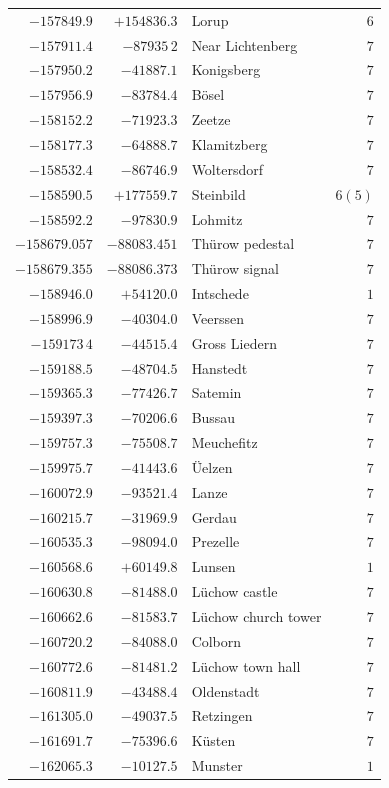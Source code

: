 \begin{center}
\begin{tabular}{r|r|p{170pt}|r}
\(-157849.9\)&\(+154836.3\)&Lorup&\(6\)\\
\(-157911.4\)&\(-87935\,2\)&Near Lichtenberg&\(7\)\\
\(-157950.2\)&\(-41887.1\)&Konigsberg&\(7\)\\
\(-157956.9\)&\(-83784.4\)&Bösel&\(7\)\\
\(-158152.2\)&\(-71923.3\)&Zeetze&\(7\)\\
\(-158177.3\)&\(-64888.7\)&Klamitzberg&\(7\)\\
\(-158532.4\)&\(-86746.9\)&Woltersdorf&\(7\)\\
\(-158590.5\)&\(+177559.7\)&Steinbild&\(6 (5)\)\\
\(-158592.2\)&\(-97830.9\)&Lohmitz&\(7\)\\
\(-158679.057\)&\(-88083.451\)&Thürow pedestal&\(7\)\\
\(-158679.355\)&\(-88086.373\)&Thürow signal&\(7\)\\
\(-158946.0\)&\(+54120.0\)&Intschede&\(1\)\\
\(-158996.9\)&\(-40304.0\)&Veerssen&\(7\)\\
\(-159173\,4\)&\(-44515.4\)&Gross Liedern&\(7\)\\
\(-159188.5\)&\(-48704.5\)&Hanstedt&\(7\)\\
\(-159365.3\)&\(-77426.7\)&Satemin&\(7\)\\
\(-159397.3\)&\(-70206.6\)&Bussau&\(7\)\\
\(-159757.3\)&\(-75508.7\)&Meuchefitz&\(7\)\\
\(-159975.7\)&\(-41443.6\)&Üelzen&\(7\)\\
\(-160072.9\)&\(-93521.4\)&Lanze&\(7\)\\
\(-160215.7\)&\(-31969.9\)&Gerdau&\(7\)\\
\(-160535.3\)&\(-98094.0\)&Prezelle&\(7\)\\
\(-160568.6\)&\(+60149.8\)&Lunsen&\(1\)\\
\(-160630.8\)&\(-81488.0\)&Lüchow castle&\(7\)\\
\(-160662.6\)&\(-81583.7\)&Lüchow church tower&\(7\)\\
\(-160720.2\)&\(-84088.0\)&Colborn&\(7\)\\
\(-160772.6\)&\(-81481.2\)&Lüchow town hall&\(7\)\\
\(-160811.9\)&\(-43488.4\)&Oldenstadt&\(7\)\\
\(-161305.0\)&\(-49037.5\)&Retzingen&\(7\)\\
\(-161691.7\)&\(-75396.6\)&Küsten&\(7\)\\
\(-162065.3\)&\(-10127.5\)&Munster&\(1\)\\
\hline\end{tabular}\endgroup\end{center}
